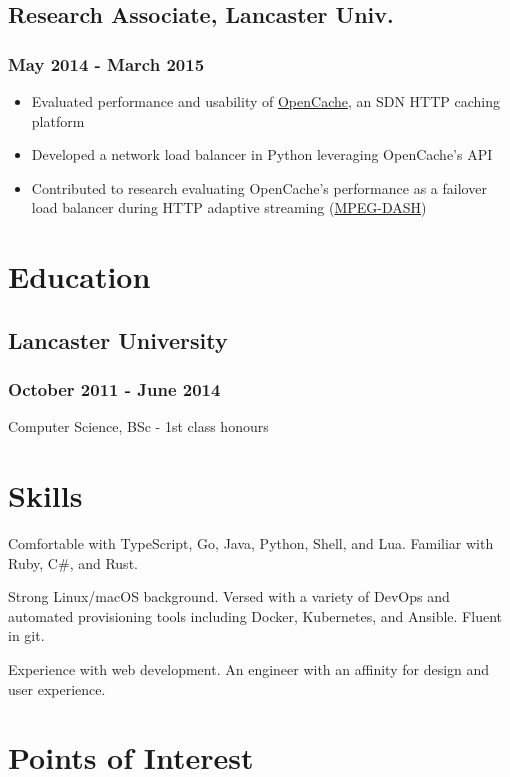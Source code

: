 \documentclass[a4paper,11pt]{article}
\begin{document}
\begin{multicols*}{2}
\subsection*{Research Associate, Lancaster Univ.}
\subsubsection*{May 2014 - March 2015}
\begin{itemize}[leftmargin=*]
	\item Evaluated performance and usability of \href{https://github.com/broadbent/opencache}{OpenCache}, an SDN HTTP caching platform
	\item Developed a network load balancer in Python leveraging OpenCache's API
	\item Contributed to research evaluating OpenCache's performance as a failover load balancer during HTTP adaptive streaming (\href{https://en.wikipedia.org/wiki/Dynamic_Adaptive_Streaming_over_HTTP}{MPEG-DASH})
\end{itemize}

\section*{Education}
\subsection*{Lancaster University}
\subsubsection*{October 2011 - June 2014}
Computer Science, BSc - 1st class honours\par

\section*{Skills}
Comfortable with TypeScript, Go, Java, Python, Shell, and Lua. Familiar with Ruby, C\#, and Rust.\medskip

Strong Linux/macOS background. Versed with a variety of DevOps and automated provisioning tools including Docker, Kubernetes, and Ansible. Fluent in git.\medskip

Experience with web development. An engineer with an affinity for design and user experience.

\section*{Points of Interest}

\end{multicols*}
\end{document}
